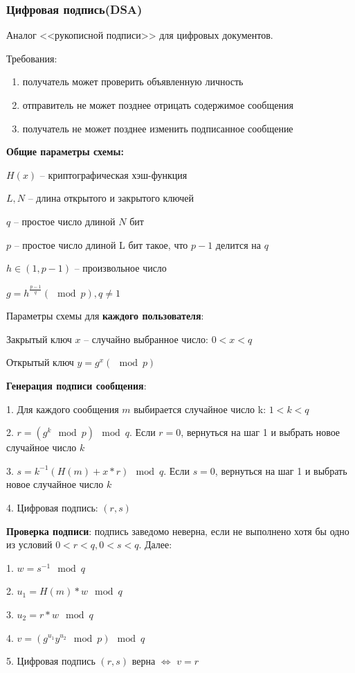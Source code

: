 \subsubsection{Цифровая подпись(DSA)}

Аналог <<рукописной подписи>> для цифровых документов.

Требования:
\begin{enumerate}
    \item получатель может проверить объявленную личность 
    \item отправитель не может позднее отрицать содержимое сообщения
    \item получатель не может позднее изменить подписанное сообщение
\end{enumerate}

\textbf{Общие параметры схемы:}

$H(x)$ -- криптографическая хэш-функция

$L, N$ -- длина открытого и закрытого ключей

$q$ -- простое число длиной $N$ бит

$p$ -- простое число длиной L бит такое, что $p - 1$ делится на $q$

$h \in (1, p - 1)$ -- произвольное число

$g = h^{\frac{p-1}{q}}(\mod p), q \neq 1$

Параметры схемы для \textbf{каждого пользователя}:

Закрытый ключ $x$ -- случайно выбранное число: $0 < x < q$

Открытый ключ $y = g^x(\mod p)$

\textbf{Генерация подписи сообщения}:

1. Для каждого сообщения $m$ выбирается случайное число k: $1 < k < q$

2. $r = (g^k \mod p) \mod q$. Если $r = 0$, вернуться на шаг 1 и выбрать новое случайное число $k$

3. $s = k^{-1}(H(m) + x * r) \mod q$. Если $s = 0$, вернуться на шаг 1 и выбрать новое случайное число $k$

4. Цифровая подпись: $(r, s)$

\textbf{Проверка подписи}: подпись заведомо неверна, если не выполнено хотя бы одно из условий $0 < r < q, 0 < s < q$. Далее:

1. $w = s^{-1} \mod q$

2. $u_1 = H(m) * w \mod q$

3. $u_2 = r * w \mod q$

4. $v = (g^{u_1}y^{u_2} \mod p) \mod q$

5. Цифровая подпись $(r, s)$ верна $\Leftrightarrow$ $v = r$